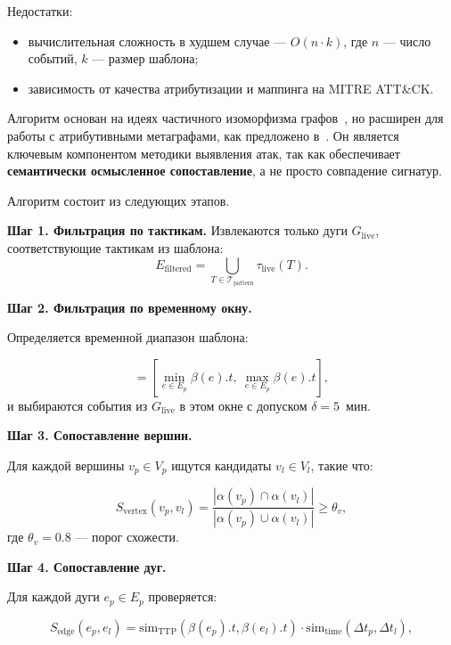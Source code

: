 Недостатки:

\noindent
\begin{itemize}
    \item вычислительная сложность в худшем случае — $O(n \cdot k)$, где $n$ — число событий, $k$ — размер шаблона;
    \item зависимость от качества атрибутизации и маппинга на MITRE ATT\&CK.
\end{itemize}

Алгоритм основан на идеях частичного изоморфизма графов~\cite{Sheyner2002}, но расширен для работы с атрибутивными метаграфами, как предложено в~\cite{Latypov2020}. Он является ключевым компонентом методики выявления атак, так как обеспечивает \textbf{семантически осмысленное сопоставление}, а не просто совпадение сигнатур.

Алгоритм состоит из следующих этапов.

\textbf{Шаг 1. Фильтрация по тактикам.}
Извлекаются только дуги $G_{\text{live}}$, соответствующие тактикам из шаблона:
\begin{equation}
    E_{\text{filtered}} = \bigcup_{T \in \mathcal{T}_{\text{pattern}}} \tau_{\text{live}}(T).
    \label{eq:filter_tactics}
\end{equation}

\textbf{Шаг 2. Фильтрация по временному окну.}

Определяется временной диапазон шаблона:

\begin{equation}
    [t_{\min}, t_{\max}] = \left[ \min_{e \in E_p} \beta(e).t,\ \max_{e \in E_p} \beta(e).t \right],
    \label{eq:time_window}
\end{equation}
и выбираются события из $G_{\text{live}}$ в этом окне с допуском $\delta = 5$~мин.

\textbf{Шаг 3. Сопоставление вершин.}

Для каждой вершины $v_p \in V_p$ ищутся кандидаты $v_l \in V_l$, такие что:

\begin{equation}
    S_{\text{vertex}}(v_p, v_l) = \frac{|\alpha(v_p) \cap \alpha(v_l)|}{|\alpha(v_p) \cup \alpha(v_l)|} \geq \theta_v,
    \label{eq:vertex_sim}
\end{equation}
где $\theta_v = 0.8$ — порог схожести.

\textbf{Шаг 4. Сопоставление дуг.}

Для каждой дуги $e_p \in E_p$ проверяется:

\begin{equation}
    S_{\text{edge}}(e_p, e_l) = \text{sim}_{\text{TTP}}(\beta(e_p).t, \beta(e_l).t) \cdot \text{sim}_{\text{time}}(\Delta t_p, \Delta t_l),
    \label{eq:edge_sim}
\end{equation}

